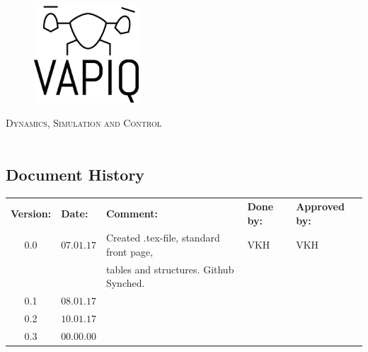 \documentclass{article}
\author{Aleksander Holthe  \\ Katrine Sundal Haune \\ Kent Kjeldaas \\ Stian Fredriksen \\ Tomas Lyngroth \\ Vanja Katinka Halvorsen}
\makeatletter
\let\vapiqteam\@author
\makeatother
\begin{document}
\begin{titlepage}
    \centering
    \pagecolor{gainsboro}
	\\[3.0 cm]
    \begin{figure}[h]
        \centering
        \includegraphics[width = 0.35\textwidth]{VAPIQ-PICTURES//Logo2_Tilted.png}
        \\[2.0 cm] 
    \end{figure}                              
    \textsc{\Huge Dynamics, Simulation and Control}  
    \\[1 cm]
    \textsc{\Large}   
    \\[3.0 cm]
	\large \vapiqteam      
\end{titlepage}
\pagecolor{white}


\begin{center}
\section*{\textbf{Document History}}
\begin{tabular}{cllll}
\rowcolor{cadetgrey}
\textbf{Version:}    &\textbf{Date:} 	 &\textbf{Comment:}    &\textbf{Done by:}   &\textbf{Approved by:}  \\

0.0       & $07.01.17$   & Created .tex-file, standard front page, & VKH  & VKH \\
          &              & tables and structures. Github Synched.    &     & \\\rowcolor{gainsboro}
0.1       & $08.01.17$   &   &     &    \\
0.2       & $10.01.17$   &      &   &           \\ \rowcolor{gainsboro}
0.3       & $00.00.00$   &    &         \\
\end{tabular}                                                                   
\end{center}
\end{document}
